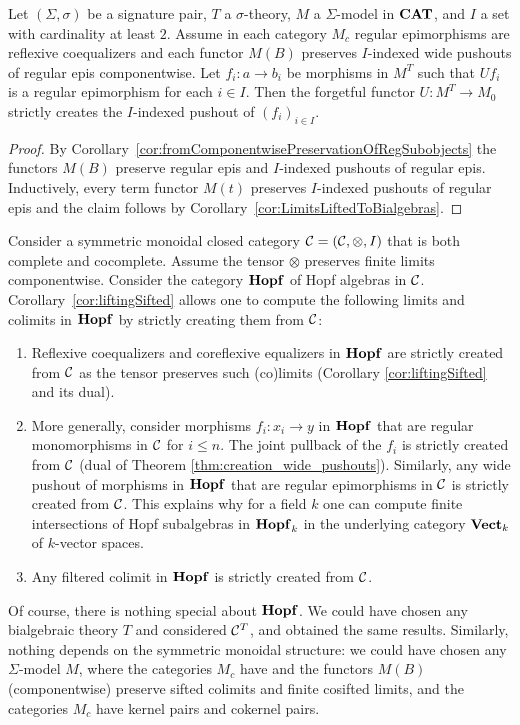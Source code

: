 \begin{theorem}\label{thm:creation_wide_pushouts}
    Let $(\Sigma,\sigma)$ be a signature pair,  $T$ a $\sigma$-theory, $M$ a $\Sigma$-model in $\mathbf{CAT}$, and $I$ a set with cardinality at least $2$. Assume in each category $M_c$ regular epimorphisms are reflexive coequalizers and each functor $M(B)$ preserves $I$-indexed wide pushouts of regular epis componentwise. Let $f_i\colon a\to b_i$ be morphisms in $M^T$ such that $Uf_i$ is a regular epimorphism for each $i\in I$. Then the forgetful functor $U\colon M^T\to M_0$ strictly creates the $I$-indexed pushout of $(f_i)_{i\in I}$.
\end{theorem}
\begin{proof}
    By Corollary~\ref{cor:fromComponentwisePreservationOfRegSubobjects} the functors $M(B)$ preserve regular epis and $I$-indexed pushouts of regular epis. Inductively, every term functor $M(t)$ preserves $I$-indexed pushouts of regular epis and the claim follows by Corollary~\ref{cor:LimitsLiftedToBialgebras}.
\end{proof}

\begin{example}
    Consider a symmetric monoidal closed category $\mathcal{C} = (\mathcal{C},\otimes,I)$ that is both complete and cocomplete. Assume the tensor $\otimes$ preserves finite limits componentwise. Consider the category $\mathbf{Hopf}$ of Hopf algebras in $\mathcal{C}$. Corollary~\ref{cor:liftingSifted} allows one to compute the following limits and colimits in $\mathbf{Hopf}$ by strictly creating them from $\mathcal{C}$:
    \begin{enumerate}
        \item Reflexive coequalizers and coreflexive equalizers in $\mathbf{Hopf}$ are strictly created from $\mathcal{C}$ as the tensor preserves such (co)limits (Corollary \ref{cor:liftingSifted} and its dual).
        \item More generally, consider morphisms $f_i\colon x_i\to y$ in $\mathbf{Hopf}$ that are regular monomorphisms in $\mathcal{C}$ for $i\leq n$. The joint pullback of the $f_i$ is strictly created from $\mathcal{C}$ (dual of Theorem \ref{thm:creation_wide_pushouts}). Similarly, any wide pushout of morphisms in $\mathbf{Hopf}$ that are regular epimorphisms in $\mathcal{C}$ is strictly created from $\mathcal{C}$. This explains why for a field $k$ one can compute finite intersections of Hopf subalgebras in $\mathbf{Hopf}_k$ in the underlying category $\mathbf{Vect}_k$ of $k$-vector spaces. 
        \item Any filtered colimit in $\mathbf{Hopf}$ is strictly created from $\mathcal{C}$.
    \end{enumerate}
    Of course, there is nothing special about $\mathbf{Hopf}$. We could have chosen any bialgebraic theory $T$ and considered $\mathcal{C}^T$, and obtained the same results. Similarly, nothing depends on the symmetric monoidal structure: we could have chosen any $\Sigma$-model $M$, where the categories $M_c$ have and the functors $M(B)$ (componentwise) preserve sifted colimits and finite cosifted limits, and the categories $M_c$ have kernel pairs and cokernel pairs.
\end{example}

